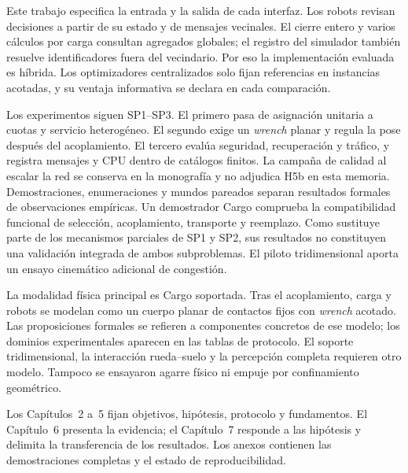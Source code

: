 Este trabajo especifica la entrada y la salida de cada interfaz. Los robots
revisan decisiones a partir de su estado y de mensajes vecinales. El cierre
entero y varios cálculos por carga consultan agregados globales; el registro del
simulador también resuelve identificadores fuera del vecindario. Por eso la
implementación evaluada es híbrida. Los optimizadores centralizados solo fijan
referencias en instancias acotadas, y su ventaja informativa se declara en cada
comparación.

Los experimentos siguen SP1--SP3. El primero pasa de asignación unitaria a
cuotas y servicio heterogéneo. El segundo exige un \emph{wrench} planar y regula
la pose después del acoplamiento. El tercero evalúa seguridad, recuperación y
tráfico, y registra mensajes y CPU dentro de catálogos finitos. La campaña de
calidad al escalar la red se conserva en la monografía y no adjudica H5b en esta
memoria. Demostraciones, enumeraciones y mundos pareados separan resultados
formales de observaciones empíricas. Un demostrador Cargo comprueba la
compatibilidad funcional de selección, acoplamiento,
transporte y reemplazo. Como sustituye parte de los mecanismos parciales de SP1
y SP2, sus resultados no constituyen una validación integrada de ambos
subproblemas. El
piloto tridimensional aporta un ensayo cinemático adicional de congestión.

La modalidad física principal es Cargo soportada. Tras el acoplamiento, carga y
robots se modelan como un cuerpo planar de contactos fijos con \emph{wrench}
acotado. Las proposiciones formales se refieren a componentes concretos de ese
modelo; los dominios experimentales aparecen en las tablas de protocolo. El
soporte tridimensional, la interacción rueda--suelo y la percepción completa
requieren otro modelo. Tampoco se ensayaron agarre físico ni empuje por
confinamiento geométrico.



Los Capítulos~2 a~5 fijan objetivos, hipótesis, protocolo y fundamentos. El
Capítulo~6 presenta la evidencia; el Capítulo~7 responde a las hipótesis y
delimita la transferencia de los resultados. Los anexos contienen las
demostraciones completas y el estado de reproducibilidad.
